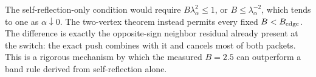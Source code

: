 \begin{remark}
The self-reflection-only condition would require
$B\lambda_\alpha^2\leq1$, or $B\leq\lambda_\alpha^{-2}$, which tends to one
as $\alpha\downarrow0$. The two-vertex theorem instead permits every fixed
$B<B_{\rm edge}$. The difference is exactly the opposite-sign neighbor
residual already present at the switch: the exact push combines with it and
cancels most of both packets. This is a rigorous mechanism by which the
measured $B=2.5$ can outperform a band rule derived from self-reflection
alone.
\end{remark}
